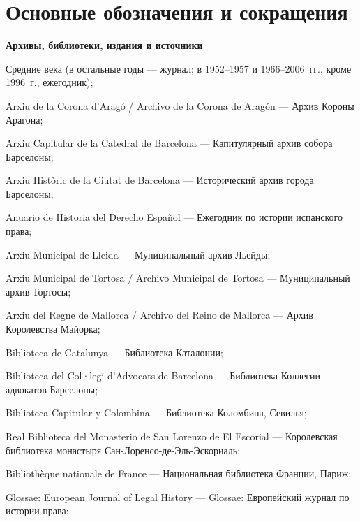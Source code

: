 \chapter*{Основные обозначения и сокращения}

\noindent\textbf{Архивы, библиотеки, издания и источники}

\begin{description}[style=standard,align=left,labelwidth=2.6cm,leftmargin=2.9cm,
                    labelsep=0.3cm,font=\normalfont\bfseries]
	\item[СВ ---] Средние века (в остальные годы --- журнал; в 1952--1957 и 1966--2006~гг., кроме 1996~г., ежегодник);
	\item[ACA ---] Arxiu de la Corona d’Aragó / Archivo de la Corona de Aragón --- Архив Короны Арагона;
	\item[ACBEB ---] Arxiu Capitular de la Catedral de Barcelona --- Капитулярный архив собора Барселоны;
	\item[AHCB ---] Arxiu Històric de la Ciutat de Barcelona --- Исторический архив города Барселоны;
	\item[AHDE ---] Anuario de Historia del Derecho Español --- Ежегодник по истории испанского права;
	\item[AML ---] Arxiu Municipal de Lleida --- Муниципальный архив Льейды;
	\item[AMT ---] Arxiu Municipal de Tortosa / Archivo Municipal de Tortosa --- Муниципальный архив Тортосы;
	\item[ARM ---] Arxiu del Regne de Mallorca / Archivo del Reino de Mallorca --- Архив Королевства Майорка;
	\item[BC ---] Biblioteca de Catalunya --- Библиотека Каталонии;
	\item[BCA ---] Biblioteca del Col·legi d’Advocats de Barcelona --- Библиотека Коллегии адвокатов Барселоны;
	\item[BCC ---] Biblioteca Capitular y Colombina --- Библиотека Коломбина, Севилья;
	\item[BE ---] Real Biblioteca del Monasterio de San Lorenzo de El Escorial --- Королевская библиотека монастыря Сан-Лоренсо-де-Эль-Эскориаль;
	\item[BNF ---] Bibliothèque nationale de France --- Национальная библиотека Франции, Париж;
	\item[Glossae ---] Glossae: European Journal of Legal History --- Glossae: Европейский журнал по истории права;

\end{description}
